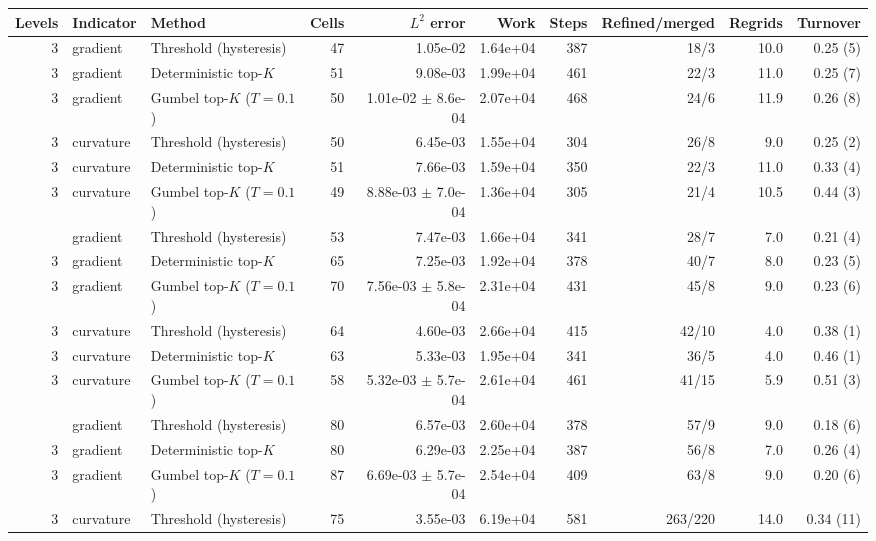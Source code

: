 \begin{tabular}{rllrrrrrrr}
\toprule
Levels & Indicator & Method & Cells & $L^2$ error & Work & Steps & Refined/merged & Regrids & Turnover \\
\midrule
3 & gradient & Threshold (hysteresis) & 47 & 1.05e-02 & 1.64e+04 & 387 & 18/3 & 10.0 & 0.25 (5) \\
3 & gradient & Deterministic top-$K$ & 51 & 9.08e-03 & 1.99e+04 & 461 & 22/3 & 11.0 & 0.25 (7) \\
3 & gradient & Gumbel top-$K$ ($T=0.1$) & 50 & 1.01e-02 $\pm$ 8.6e-04 & 2.07e+04 & 468 & 24/6 & 11.9 & 0.26 (8) \\
3 & curvature & Threshold (hysteresis) & 50 & 6.45e-03 & 1.55e+04 & 304 & 26/8 & 9.0 & 0.25 (2) \\
3 & curvature & Deterministic top-$K$ & 51 & 7.66e-03 & 1.59e+04 & 350 & 22/3 & 11.0 & 0.33 (4) \\
3 & curvature & Gumbel top-$K$ ($T=0.1$) & 49 & 8.88e-03 $\pm$ 7.0e-04 & 1.36e+04 & 305 & 21/4 & 10.5 & 0.44 (3) \\
\addlinespace
3 & gradient & Threshold (hysteresis) & 53 & 7.47e-03 & 1.66e+04 & 341 & 28/7 & 7.0 & 0.21 (4) \\
3 & gradient & Deterministic top-$K$ & 65 & 7.25e-03 & 1.92e+04 & 378 & 40/7 & 8.0 & 0.23 (5) \\
3 & gradient & Gumbel top-$K$ ($T=0.1$) & 70 & 7.56e-03 $\pm$ 5.8e-04 & 2.31e+04 & 431 & 45/8 & 9.0 & 0.23 (6) \\
3 & curvature & Threshold (hysteresis) & 64 & 4.60e-03 & 2.66e+04 & 415 & 42/10 & 4.0 & 0.38 (1) \\
3 & curvature & Deterministic top-$K$ & 63 & 5.33e-03 & 1.95e+04 & 341 & 36/5 & 4.0 & 0.46 (1) \\
3 & curvature & Gumbel top-$K$ ($T=0.1$) & 58 & 5.32e-03 $\pm$ 5.7e-04 & 2.61e+04 & 461 & 41/15 & 5.9 & 0.51 (3) \\
\addlinespace
3 & gradient & Threshold (hysteresis) & 80 & 6.57e-03 & 2.60e+04 & 378 & 57/9 & 9.0 & 0.18 (6) \\
3 & gradient & Deterministic top-$K$ & 80 & 6.29e-03 & 2.25e+04 & 387 & 56/8 & 7.0 & 0.26 (4) \\
3 & gradient & Gumbel top-$K$ ($T=0.1$) & 87 & 6.69e-03 $\pm$ 5.7e-04 & 2.54e+04 & 409 & 63/8 & 9.0 & 0.20 (6) \\
3 & curvature & Threshold (hysteresis) & 75 & 3.55e-03 & 6.19e+04 & 581 & 263/220 & 14.0 & 0.34 (11) \\

\end{tabular}
